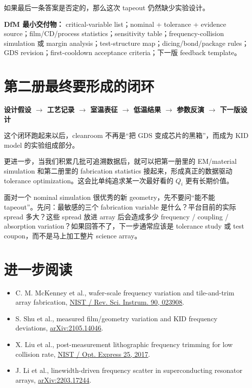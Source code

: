 如果最后一条答案是否定的，那么这次 tapeout 仍然缺少实验设计。

\begin{measurebox}
\textbf{DfM 最小交付物：}
critical-variable list；nominal + tolerance + evidence source；film/CD/process statistics；sensitivity table；frequency-collision simulation 或 margin analysis；test-structure map；dicing/bond/package rules；GDS revision；first-cooldown acceptance criteria；下一版 feedback template。
\end{measurebox}

\section{第二册最终要形成的闭环}

\begin{center}
\textbf{设计假设 $\rightarrow$ 工艺记录 $\rightarrow$ 室温表征 $\rightarrow$ 低温结果 $\rightarrow$ 参数反演 $\rightarrow$ 下一版设计}
\end{center}

这个闭环跑起来以后，cleanroom 不再是“把 GDS 变成芯片的黑箱”，而成为 KID model 的实验组成部分。

更进一步，当我们积累几批可追溯数据后，就可以把第一册里的 EM/material simulation 和第二册里的 fabrication statistics 接起来，形成真正的数据驱动 tolerance optimization。这会比单纯追求某一次最好看的 $Q_i$ 更有长期价值。

\begin{checkpointbox}
面对一个 nominal simulation 很优秀的新 geometry，先不要问“能不能 tapeout”。先问：最敏感的三个 fabrication variable 是什么？平台目前的实际 spread 多大？这些 spread 放进 array 后会造成多少 frequency / coupling / absorption variation？如果回答不了，下一步通常应该是 tolerance study 或 test coupon，而不是马上加工整片 science array。
\end{checkpointbox}

\section*{进一步阅读}

\begin{itemize}
  \item C. M. McKenney et al., wafer-scale frequency variation and tile-and-trim array fabrication, \href{https://www.nist.gov/publications/tile-and-trim-micro-resonator-array-fabrication-optimized-high-multiplexing-factors}{NIST / Rev. Sci. Instrum. 90, 023908}.
  \item S. Shu et al., measured film/geometry variation and KID frequency deviations, \href{https://arxiv.org/abs/2105.14046}{arXiv:2105.14046}.
  \item X. Liu et al., post-measurement lithographic frequency trimming for low collision rate, \href{https://www.nist.gov/publications/superconducting-micro-resonator-arrays-ideal-frequency-spacing}{NIST / Opt. Express 25, 2017}.
  \item J. Li et al., linewidth-driven frequency scatter in superconducting resonator arrays, \href{https://arxiv.org/abs/2203.17244}{arXiv:2203.17244}.
\end{itemize}
